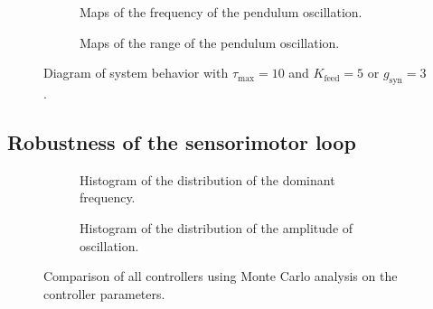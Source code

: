\begin{figure}[!htb]
    \centering
    \begin{subfigure}[t][.46\textheight][b]{\textwidth}
        \centering
        \caption{Maps of the frequency of the pendulum oscillation.}
        \label{fig:double_t10_high_freq}
    \end{subfigure}
    
    \begin{subfigure}[b][.46\textheight][t]{\textwidth}
        \centering
        \caption{Maps of the range of the pendulum oscillation.}
        \label{fig:double_t10_high_range}
    \end{subfigure}
    \caption{Diagram of system behavior with $\tau_\text{max}=10$ and $K_\text{feed} = 5$ or $g_{\text{syn}} = 3$.}
    \label{fig:double_t10_high}
\end{figure}



\subsection{Robustness of the sensorimotor loop}

\begin{figure}[!htb]
    \centering
    \begin{subfigure}[b]{\textwidth}
        \centering
        \caption{Histogram of the distribution of the dominant frequency.}
        \label{fig:double_monte_freq}
    \end{subfigure}
    
    \begin{subfigure}[b]{\textwidth}
        \centering
        \caption{Histogram of the distribution of the amplitude of oscillation.}
        \label{fig:double_monte_range}
    \end{subfigure}
    \caption{Comparison of all controllers using Monte Carlo analysis on the controller parameters.}
    \label{fig:double_monte}
\end{figure}

